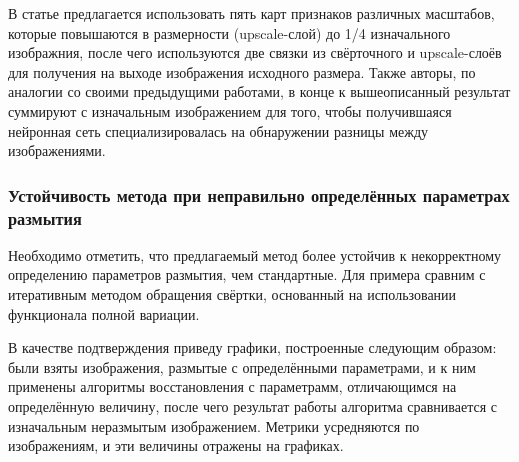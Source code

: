 В статье предлагается использовать пять карт признаков различных масштабов, которые повышаются в размерности (upscale-слой) до 1/4 изначального изображния, после чего используются две связки из свёрточного и upscale-слоёв для получения на выходе изображения исходного размера. Также авторы, по аналогии со своими предыдущими работами, в конце к вышеописанный результат суммируют с изначальным изображением для того, чтобы получившаяся нейронная сеть специализировалась на обнаружении разницы между изображениями.

\subsubsection{Устойчивость метода при неправильно определённых параметрах размытия}

Необходимо отметить, что предлагаемый метод более устойчив к некорректному определению параметров размытия, чем стандартные. Для примера сравним с итеративным методом обращения свёртки, основанный на использовании функционала полной вариации. 

В качестве подтверждения приведу графики, построенные следующим образом: были взяты изображения, размытые с определёнными параметрами, и к ним применены алгоритмы восстановления с параметрамм, отличающимся на определённую величину, после чего результат работы алгоритма сравнивается с изначальным неразмытым изображением. Метрики усредняются по изображениям, и эти величины отражены на графиках.

